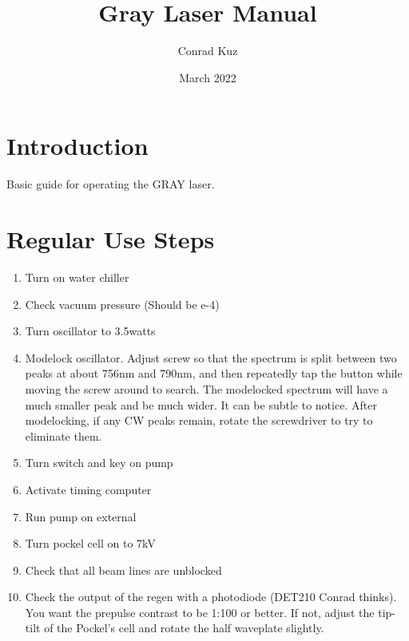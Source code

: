 \documentclass{article}
\title{Gray Laser Manual}
\author{Conrad Kuz}
\date{March 2022}
\begin{document}
\maketitle

\section{Introduction}
Basic guide for operating the GRAY laser.

\section{Regular Use Steps}
\begin{enumerate}
    \item Turn on water chiller
    \item Check vacuum pressure (Should be e-4)
    \item Turn oscillator to 3.5watts
    \item Modelock oscillator. Adjust screw so that the spectrum is split between two peaks at about 756nm and 790nm, and then repeatedly tap the button while moving the screw around to search. The modelocked spectrum will have a much smaller peak and be much wider. It can be subtle to notice. After modelocking, if any CW peaks remain, rotate the screwdriver to try to eliminate them.
    \item Turn switch and key on pump
    \item Activate timing computer
    \item Run pump on external
    \item Turn pockel cell on to 7kV
    \item Check that all beam lines are unblocked
    \item Check the output of the regen with a photodiode (DET210 Conrad thinks). You want the prepulse contrast to be 1:100 or better. If not, adjust the tip-tilt of the Pockel's cell and rotate the half waveplate slightly.
\end{enumerate}
\end{document}
